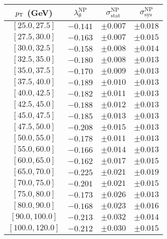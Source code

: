 \begin{tabular}{c||c||c|c}
$p_\text{T}$ (GeV) & $\lambda_\theta^{\text{NP}}$ & $\sigma_{\text{stat}}^{\text{NP}}$ & $\sigma_{\text{sys}}^{\text{NP}}$  \\
\hline
$[25.0, 27.5]$& $-0.141$ & $\pm0.007$ & $\pm0.018$\\
$[27.5, 30.0]$& $-0.163$ & $\pm0.007$ & $\pm0.015$\\
$[30.0, 32.5]$& $-0.158$ & $\pm0.008$ & $\pm0.014$\\
$[32.5, 35.0]$& $-0.180$ & $\pm0.008$ & $\pm0.013$\\
$[35.0, 37.5]$& $-0.170$ & $\pm0.009$ & $\pm0.013$\\
$[37.5, 40.0]$& $-0.189$ & $\pm0.010$ & $\pm0.013$\\
$[40.0, 42.5]$& $-0.182$ & $\pm0.011$ & $\pm0.013$\\
$[42.5, 45.0]$& $-0.188$ & $\pm0.012$ & $\pm0.013$\\
$[45.0, 47.5]$& $-0.185$ & $\pm0.013$ & $\pm0.013$\\
$[47.5, 50.0]$& $-0.208$ & $\pm0.015$ & $\pm0.013$\\
$[50.0, 55.0]$& $-0.178$ & $\pm0.011$ & $\pm0.013$\\
$[55.0, 60.0]$& $-0.166$ & $\pm0.014$ & $\pm0.013$\\
$[60.0, 65.0]$& $-0.162$ & $\pm0.017$ & $\pm0.015$\\
$[65.0, 70.0]$& $-0.225$ & $\pm0.021$ & $\pm0.019$\\
$[70.0, 75.0]$& $-0.201$ & $\pm0.021$ & $\pm0.015$\\
$[75.0, 80.0]$& $-0.173$ & $\pm0.026$ & $\pm0.013$\\
$[80.0, 90.0]$& $-0.168$ & $\pm0.023$ & $\pm0.016$\\
$[90.0, 100.0]$& $-0.213$ & $\pm0.032$ & $\pm0.014$\\
$[100.0, 120.0]$& $-0.212$ & $\pm0.030$ & $\pm0.015$\\
\end{tabular}
